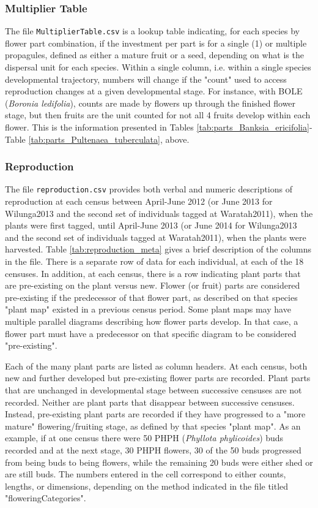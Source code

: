 \documentclass[10pt,twoside]{article}\usepackage[]{graphicx}\usepackage[]{color}
\begin{document}
\subsubsection{Multiplier Table}
The file \texttt{MultiplierTable.csv} is a lookup table indicating, for each species by flower part combination, if the investment per part is for a single (1) or multiple propagules, defined as either a mature fruit or a seed, depending on what is the dispersal unit for each species. Within a single column, i.e. within a single species developmental trajectory, numbers will change if the "count" used to access reproduction changes at a given developmental stage. For instance, with BOLE (\emph{Boronia ledifolia}), counts are made by flowers up through the finished flower stage, but then fruits are the unit counted for not all 4 fruits develop within each flower. This is the information presented in Tables \ref{tab:parts_Banksia_ericifolia}-Table \ref{tab:parts_Pultenaea_tuberculata}, above.

\subsubsection{Reproduction}

The file \texttt{reproduction.csv} provides both verbal and numeric descriptions of reproduction at each census between April-June 2012 (or June 2013 for Wilunga2013 and the second set of individuals tagged at Waratah2011), when the plants were first tagged, until April-June 2013 (or June 2014 for Wilunga2013 and the second set of individuals tagged at Waratah2011), when the plants were harvested. Table \ref{tab:reproduction_meta} gives a brief description of the columns in the file. There is a separate row of data for each individual, at each of the 18 censuses. In addition, at each census, there is a row indicating plant parts that are pre-existing on the plant versus new. Flower (or fruit) parts are considered pre-existing if the predecessor of that flower part, as described on that species "plant map" existed in a previous census period. Some plant maps may have multiple parallel diagrams describing how flower parts develop. In that case, a flower part must have a predecessor on that specific diagram to be considered "pre-existing".

Each of the many plant parts are listed as column headers. At each census, both new and further developed but pre-existing flower parts are recorded. Plant parts that are unchanged in developmental stage between successive censuses are not recorded. Neither are plant parts that disappear between successive censuses. Instead, pre-existing plant parts are recorded if they have progressed to a "more mature" flowering/fruiting stage, as defined by that species "plant map". As an example, if at one census there were 50 PHPH (\emph{Phyllota phylicoides}) buds recorded and at the next stage, 30 PHPH flowers, 30 of the 50 buds progressed from being buds to being flowers, while the remaining 20 buds were either shed or are still buds. The numbers entered in the cell correspond to either counts, lengths, or dimensions, depending on the method indicated in the file titled "floweringCategories".
\end{document}
